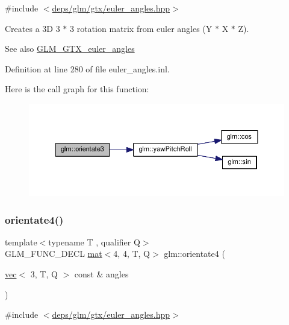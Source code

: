 {\ttfamily \#include $<$\hyperlink{euler__angles_8hpp}{deps/glm/gtx/euler\+\_\+angles.\+hpp}$>$}

Creates a 3D 3 $\ast$ 3 rotation matrix from euler angles (Y $\ast$ X $\ast$ Z). \begin{DoxySeeAlso}{See also}
\hyperlink{group__gtx__euler__angles}{G\+L\+M\+\_\+\+G\+T\+X\+\_\+euler\+\_\+angles} 
\end{DoxySeeAlso}


Definition at line 280 of file euler\+\_\+angles.\+inl.

Here is the call graph for this function\+:
\nopagebreak
\begin{figure}[H]
\begin{center}
\leavevmode
\includegraphics[width=350pt]{d2/d7e/group__gtx__euler__angles_ga7238c8e15c7720e3ca6a45ab151eeabb_cgraph}
\end{center}
\end{figure}
\mbox{\label{group__gtx__euler__angles_ga4a044653f71a4ecec68e0b623382b48a}} 
\subsubsection{\texorpdfstring{orientate4()}{orientate4()}}
{\footnotesize\ttfamily template$<$typename T , qualifier Q$>$ \\
G\+L\+M\+\_\+\+F\+U\+N\+C\+\_\+\+D\+E\+CL \hyperlink{structglm_1_1mat}{mat}$<$4, 4, T, Q$>$ glm\+::orientate4 (\begin{DoxyParamCaption}\item[{\hyperlink{structglm_1_1vec}{vec}$<$ 3, T, Q $>$ const \&}]{angles }\end{DoxyParamCaption})}



{\ttfamily \#include $<$\hyperlink{euler__angles_8hpp}{deps/glm/gtx/euler\+\_\+angles.\+hpp}$>$}

